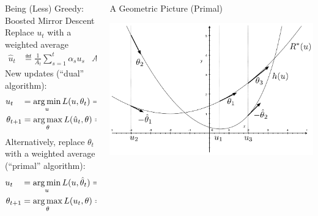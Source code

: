 \documentclass[final]{beamer}
\begin{document}
\begin{frame}{}
\begin{columns}
\begin{column}{0.46\linewidth}
\begin{columns}[t]
\begin{column}{.43\linewidth}
\begin{block}{\large Being (Less) Greedy: \\ Boosted Mirror Descent}
Replace $u_t$ with a weighted average
\begin{align*}
\hat{u}_t &\eqdef \frac{1}{A_{t}} \sum_{s=1}^t \alpha_{s} u_s & A_{t} = \sum_{s=1}^{t} \alpha_{s}
\end{align*}
New updates (``dual'' algorithm):
\begin{align*}
u_t\,\,\,\,\,\, &= \argmin_{u} L(u,\theta_t)  = && \partial h^{*}(-\theta_{t}) \\
\theta_{t+1}    &= \argmax_{\theta} L(\hat{u}_t, \theta)  = &&\partial R^{*}(\hat u_{t})
\end{align*}
Alternatively, replace $\theta_{t}$ with a weighted average (``primal'' algorithm):
\begin{align*}
u_t\,\,\,\,\,\, &= \argmin_{u} L(u,\hat\theta_t) = && \partial h^{*}(-\hat\theta_{t}) \\
\theta_{t+1}    &= \argmax_{\theta} L(u_t, \theta) = &&\partial R^{*}(u_{t})
\end{align*}
\end{block}
\end{column}
\begin{column}{.53\linewidth}
\begin{block}{\large A Geometric Picture (Primal)}
\begin{center}
\includegraphics[width=10in]{figures/primal-demo.pdf}
\end{center}

\end{block}
\end{column}
\end{columns}
\end{column}
\end{columns}
\end{frame}
\end{document}
